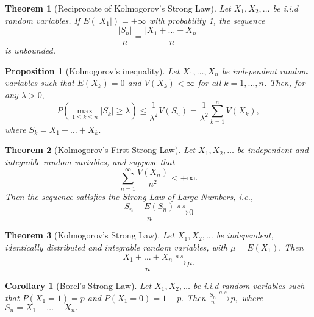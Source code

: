 \documentclass[12pt]{report} \addtolength{\textheight}{2in}
\newtheorem{cor}{Corollary}
\newtheorem{prop}{Proposition}
\newtheorem{thm}{Theorem}
\newcommand{\asto}{\overset{a.s.}{\longrightarrow}}
\begin{document}
\begin{thm}[Reciprocate of Kolmogorov's Strong Law] Let $X_1,X_2,\dots$ be i.i.d random variables. If $E(|X_1|) = +\infty$ with probability 1, the sequence 
\begin{displaymath}
\frac{|S_n|}{n}=\frac{|X_1+\dots+X_n|}{n}
\end{displaymath}
is unbounded.
\end{thm}
\begin{prop}[Kolmogorov's inequality] Let $X_1,\dots, X_n$ be independent random variables such that $E(X_k)=0$ and $V(X_k) < \infty$ for all $k=1,\dots,n$. Then, for any $\lambda > 0,$
\begin{displaymath}
P(\max_{1\leq k \leq n} |S_k| \geq \lambda) \leq \frac{1}{\lambda^2} V(S_n) =\frac{1}{\lambda^2} \sum_{k=1}^{n} V(X_k),
\end{displaymath}
where $S_k = X_1+\dots+X_k.$ 
\end{prop}
\begin{thm}[Kolmogorov's First Strong Law] Let $X_1,X_2,\dots$ be independent and integrable random variables, and suppose that 
\begin{displaymath}
\sum_{n=1}^{\infty} \frac{V(X_n)}{n^2} < +\infty.
\end{displaymath}
Then the sequence satisfies the Strong Law of Large Numbers, i.e.,
\begin{displaymath}
\frac{S_n-E(S_n)}{n} \asto 0
\end{displaymath}
\end{thm}
\begin{thm} [Kolmogorov's Strong Law] Let $X_1,X_2,\dots$ be independent, identically distributed and integrable random variables, with $\mu = E(X_1).$ Then
\begin{displaymath}
\frac{X_1+\dots+X_n}{n}\asto \mu.
\end{displaymath}
\end{thm}
\begin{cor}[Borel's Strong Law] Let $X_1,X_2,\dots $ be i.i.d random variables such that $P(X_1=1)=p$ and $P(X_1=0)=1-p.$ Then $\frac{S_n}{n} \asto p,$ where $S_n=X_1+\dots+X_n.$
\end{cor}
\end{document}

